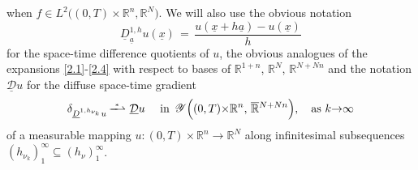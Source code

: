 \documentclass{amsart}
\theoremstyle{definition}
\numberwithin{equation}{section}
\begin{document}
when $f\in L^2\big(  (0,T){\times} {\mathbb{R}}^n,{\mathbb{R}}^N\big)$. We will also use the obvious notation 
 \[
 {\underline{D}}_{\underline{a}}^{1,h}u(\underline{x}) \, =\, \frac{u(\underline{x}+h \underline{a})-u(\underline{x})}{h} 
 \]
for the space-time difference quotients of $u$, the obvious analogues of the expansions \eqref{2.1}-\eqref{2.4} with respect to bases of ${\mathbb{R}}^{1+n}$, ${\mathbb{R}}^N$, ${\mathbb{R}}^{N+Nn}$ and the notation $\underline{\mathcal{D}} u$ for the diffuse space-time gradient
\[
{\delta}_{{\underline{D}}^{1,h_{\nu_k}}u} \, \overset{^*}{\smash{-\!\!\!\!-\!\!\!\!\rightharpoonup}}\,\, \underline{\mathcal{D}} u\ \ \ \text{ in }\, {\mathscr{Y}}\Big((0,T){\times} {\mathbb{R}}^n, \, \smash{\overline{\mathbb{R}}}^{N+Nn}\Big), \ \ \text{ as }k {\rightarrow} \infty
\]
of a measurable mapping $u :  (0,T){\times} {\mathbb{R}}^n {\longrightarrow} {\mathbb{R}}^N$ along infinitesimal subsequences $(h_{\nu_k})_1^\infty{\subseteq} (h_{\nu})_1^\infty$.
 
 {\medskip}
\end{document}
